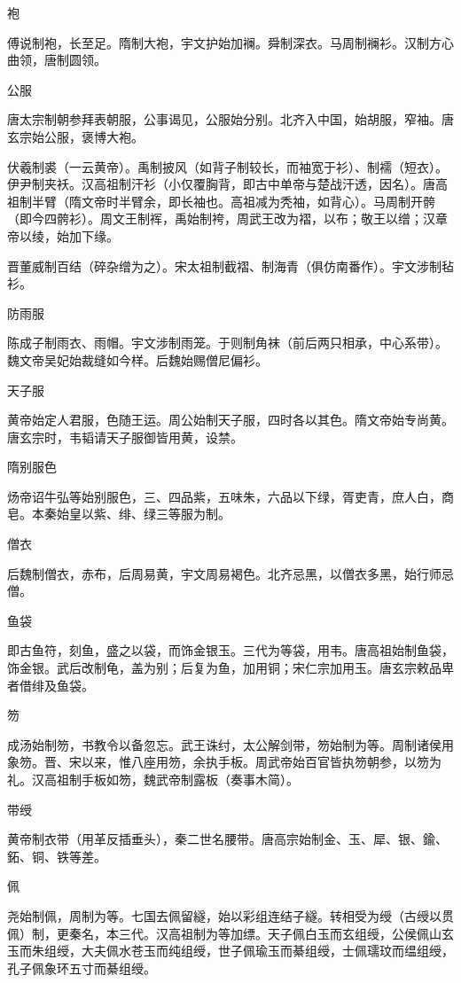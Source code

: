 \documentclass[a4paper,12pt,UTF8,twoside]{ctexbook}
\begin{document}
    袍
    
    傅说制袍，长至足。隋制大袍，宇文护始加襕。舜制深衣。马周制襕衫。汉制方心曲领，唐制圆领。
    
    公服
    
    唐太宗制朝参拜表朝服，公事谒见，公服始分别。北齐入中国，始胡服，窄袖。唐玄宗始公服，褒博大袍。
    
    伏羲制裘（一云黄帝）。禹制披风（如背子制较长，而袖宽于衫）、制襦（短衣）。伊尹制夹袄。汉高祖制汗衫（小仅覆胸背，即古中单帝与楚战汗透，因名）。唐高祖制半臂（隋文帝时半臂余，即长袖也。高祖减为秃袖，如背心）。马周制开骻（即今四骻衫）。周文王制裈，禹始制袴，周武王改为褶，以布；敬王以缯；汉章帝以绫，始加下缘。
    
    晋董威制百结（碎杂缯为之）。宋太祖制截褶、制海青（俱仿南番作）。宇文涉制毡衫。
    
    防雨服
    
    陈成子制雨衣、雨帽。宇文涉制雨笼。于则制角袜（前后两只相承，中心系带）。魏文帝吴妃始裁缝如今样。后魏始赐僧尼偏衫。
    
    天子服
    
    黄帝始定人君服，色随王运。周公始制天子服，四时各以其色。隋文帝始专尚黄。唐玄宗时，韦韬请天子服御皆用黄，设禁。
    
    隋别服色
    
    炀帝诏牛弘等始别服色，三、四品紫，五味朱，六品以下绿，胥吏青，庶人白，商皂。本秦始皇以紫、绯、绿三等服为制。
    
    僧衣
    
    后魏制僧衣，赤布，后周易黄，宇文周易褐色。北齐忌黑，以僧衣多黑，始行师忌僧。
    
    鱼袋
    
    即古鱼符，刻鱼，盛之以袋，而饰金银玉。三代为等袋，用韦。唐高祖始制鱼袋，饰金银。武后改制龟，盖为别；后复为鱼，加用铜；宋仁宗加用玉。唐玄宗敕品卑者借绯及鱼袋。
    
    笏
    
    成汤始制笏，书教令以备忽忘。武王诛纣，太公解剑带，笏始制为等。周制诸侯用象笏。晋、宋以来，惟八座用笏，余执手板。周武帝始百官皆执笏朝参，以笏为礼。汉高祖制手板如笏，魏武帝制露板（奏事木简）。
    
    带绶
    
    黄帝制衣带（用革反插垂头），秦二世名腰带。唐高宗始制金、玉、犀、银、鍮、鉐、铜、铁等差。
    
    佩
    
    尧始制佩，周制为等。七国去佩留繸，始以彩组连结子繸。转相受为绶（古绶以贯佩）制，更秦名，本三代。汉高祖制为等加缥。天子佩白玉而玄组绶，公侯佩山玄玉而朱组绶，大夫佩水苍玉而纯组绶，世子佩瑜玉而綦组绶，士佩瓀玟而缊组绶，孔子佩象环五寸而綦组绶。
    
\end{document}
